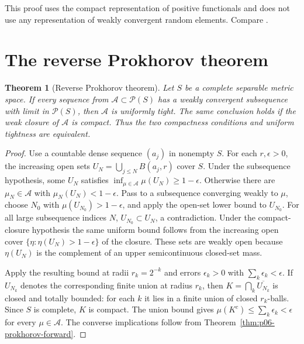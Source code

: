 \documentclass[11pt,oneside,openany]{book}
\theoremstyle{plain}
\newtheorem{theorem}{Theorem}[chapter]
\theoremstyle{definition}
\theoremstyle{remark}
\begin{document}
This proof uses the compact representation of positive functionals
and does not use any representation of weakly convergent random
elements. Compare \cite[Theorem 5.1, pp.~59--60]{Billingsley}.

\section{The reverse Prokhorov theorem}
\label{p06-06}

\begin{theorem}[Reverse Prokhorov theorem]
\label{thm:p06-prokhorov-reverse}
Let \(S\) be a complete separable metric space. If every sequence
from \(\mathcal A\subset\mathcal P(S)\) has a weakly convergent
subsequence with limit in \(\mathcal P(S)\), then \(\mathcal A\)
is uniformly tight. The same conclusion holds if the weak closure
of \(\mathcal A\) is compact. Thus the two compactness conditions and
uniform tightness are equivalent.
\end{theorem}

\begin{proof}
Use a countable dense sequence \((a_j)\) in nonempty \(S\).
For each \(r,\epsilon>0\), the increasing open sets
\(U_N=\bigcup_{j\leq N}B(a_j,r)\) cover \(S\).
Under the subsequence hypothesis, some \(U_N\) satisfies
\(\inf_{\mu\in\mathcal A}\mu(U_N)\geq1-\epsilon\).
Otherwise there are \(\mu_N\in\mathcal A\) with
\(\mu_N(U_N)<1-\epsilon\). Pass to a subsequence converging weakly
to \(\mu\), choose \(N_0\) with \(\mu(U_{N_0})>1-\epsilon\), and
apply the open-set lower bound to \(U_{N_0}\). For all large
subsequence indices \(N\), \(U_{N_0}\subset U_N\), a contradiction.
Under the compact-closure hypothesis the same uniform bound follows
from the increasing open cover
\(\{\eta:\eta(U_N)>1-\epsilon\}\) of the closure. These sets are
weakly open because \(\eta(U_N)\) is the complement of an upper
semicontinuous closed-set mass.

Apply the resulting bound at radii \(r_k=2^{-k}\) and errors
\(\epsilon_k>0\) with \(\sum_k\epsilon_k<\epsilon\). If \(U_{N_k}\)
denotes the corresponding finite union at radius \(r_k\), then
\(K=\bigcap_k\overline{U_{N_k}}\) is closed and totally bounded:
for each \(k\) it lies in a finite union of closed \(r_k\)-balls.
Since \(S\) is complete, \(K\) is compact. The union bound gives
\(\mu(K^c)\leq\sum_k\epsilon_k<\epsilon\) for every \(\mu\in\mathcal A\).
The converse implications follow from
Theorem~\ref{thm:p06-prokhorov-forward}.
\end{proof}
\end{document}
